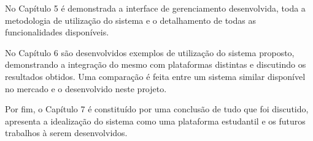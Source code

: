 No Capítulo 5 é demonstrada a interface de gerenciamento desenvolvida, toda a metodologia de utilização do sistema e o detalhamento de todas as funcionalidades disponíveis.

No Capítulo 6 são desenvolvidos exemplos de utilização do sistema proposto, demonstrando a integração do mesmo com plataformas distintas e discutindo os resultados obtidos. Uma comparação é feita entre um sistema similar disponível no mercado e o desenvolvido neste projeto.

Por fim, o Capítulo 7 é constituído por uma conclusão de tudo que foi discutido, apresenta a idealização do sistema como uma plataforma estudantil e os futuros trabalhos à serem desenvolvidos.